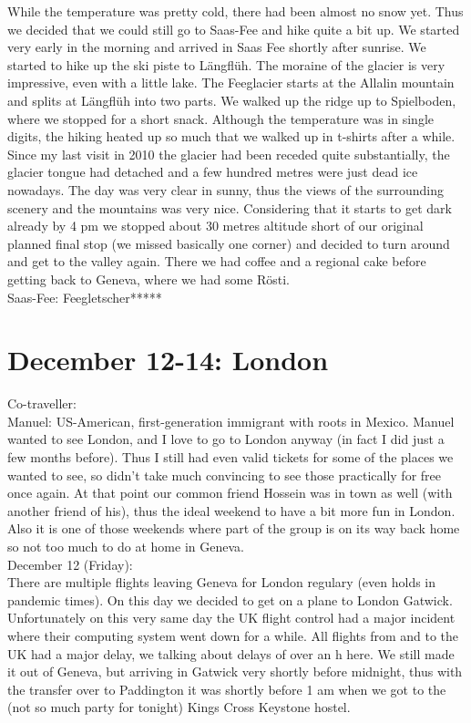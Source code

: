 While the temperature was pretty cold, there had been almost no snow yet. Thus we decided that we could still go to Saas-Fee and hike quite a bit up. We started very early in the morning and arrived in Saas Fee shortly after sunrise. We started to hike up the ski piste to L\"angfl\"uh. The moraine of the glacier is very impressive, even with a little lake. The Feeglacier starts at the Allalin mountain and splits at L\"angfl\"uh into two parts. We walked up the ridge up to Spielboden, where we stopped for a short snack. Although the temperature was in single digits, the hiking heated up so much that we walked up in t-shirts after a while. Since my last visit in 2010 the glacier had been receded quite substantially, the glacier tongue had detached and a few hundred metres were just dead ice nowadays. The day was very clear in sunny, thus the views of the surrounding scenery and the mountains was very nice. Considering that it starts to get dark already by 4 pm we stopped about 30 metres altitude short of our original planned final stop (we missed basically one corner) and decided to turn around and get to the valley again. There we had coffee and a regional cake before getting back to Geneva, where we had some R\"osti.\\

Saas-Fee: Feegletscher*****\\

\section{December 12-14: London}
\label{London2014}

Co-traveller:\\
Manuel: US-American, first-generation immigrant with roots in Mexico. Manuel wanted to see London, and I love to go to London anyway (in fact I did just a few months before). Thus I still had even valid tickets for some of the places we wanted to see, so didn't take much convincing to see those practically for free once again. At that point our common friend Hossein was in town as well (with another friend of his), thus the ideal weekend to have a bit more fun in London. Also it is one of those weekends where part of the group is on its way back home so not too much to do at home in Geneva.\\

December 12 (Friday):\\
There are multiple flights leaving Geneva for London regulary (even holds in pandemic times). On this day we decided to get on a plane to London Gatwick. Unfortunately on this very same day the UK flight control had a major incident where their computing system went down for a while. All flights from and to the UK had a major delay, we talking about delays of over an h here. We still made it out of Geneva, but arriving in Gatwick very shortly before midnight, thus with the transfer over to Paddington it was shortly before 1 am when we got to the (not so much party for tonight) Kings Cross Keystone hostel.\\

